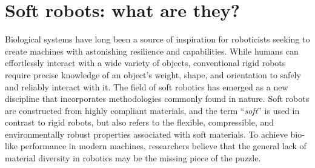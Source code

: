 \section{Soft robots: what are they?}
\label{sec:intro:history}
Biological systems have long been a source of inspiration for roboticists seeking to create machines with astonishing resilience and capabilities. While humans can effortlessly interact with a wide variety of objects, conventional rigid robots require precise knowledge of an object's weight, shape, and orientation to safely and reliably interact with it. The field of soft robotics has emerged as a new discipline that incorporates methodologies commonly found in nature. Soft robots are constructed from highly compliant materials, and the term ``\emph{soft}'' is used in contrast to rigid robots, but also refers to the flexible, compressible, and environmentally robust properties associated with soft materials. To achieve bio-like performance in modern machines, researchers believe that the general lack of material diversity in robotics may be the missing piece of the puzzle.

